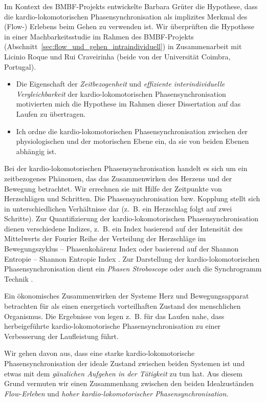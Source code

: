 Im Kontext des \acs{BMBF}-Projekts entwickelte Barbara Grüter die Hypothese, dass die kardio-lokomotorischen Phasensynchronisation als implizites Merkmal des (Flow-) Erlebens beim Gehen zu verwenden ist. Wir überprüften die Hypothese in einer Machbarkeitsstudie im Rahmen des \acs{BMBF}-Projekts (Abschnitt~\ref{sec:flow_und_gehen_intraindividuell}) in Zusammenarbeit mit Licinio Roque und Rui Craveirinha (beide von der Universität Coimbra, Portugal). 
\begin{itemize}
	
	\item Die Eigenschaft der \emph{Zeitbezogenheit} und \emph{effiziente interindividuelle Vergleichbarkeit} der kardio-lokomotorischen Phasensynchronisation motivierten mich die Hypothese im Rahmen dieser Dissertation auf das Laufen zu übertragen.
	
	\item Ich ordne die kardio-lokomotorischen Phasensynchronisation zwischen der physiologischen und der motorischen Ebene ein, da sie von beiden Ebenen abhängig ist.
	
\end{itemize}

Bei der kardio-lokomotorischen Phasensynchronisation handelt es sich um ein zeitbezogenes Phänomen, das das Zusammenwirken des Herzens und der Bewegung betrachtet. Wir errechnen sie mit Hilfe der Zeitpunkte von Herzschlägen und Schritten. Die Phasensynchronisation bzw. Kopplung stellt sich in unterschiedlichen Verhältnisse dar (z.~B. ein Herzschlag folgt auf zwei Schritte). Zur Quantifizierung der kardio-lokomotorischen Phasensynchronisation dienen verschiedene Indizes, z.~B. ein Index basierend auf der Intensität des Mittelwerts der Fourier Reihe der Verteilung der Herzschläge im Bewegungszyklus -- Phasenkohärenz Index \citep{Rosenblum2003} oder basierend auf der Shannon Entropie -- Shannon Entropie Index \citep{Tass1998, Niizeki2005}. Zur Darstellung der kardio-lokomotorischen Phasensynchronisation dient ein \emph{Phasen Stroboscope} \citep{Mrowka2000} oder auch die Synchrogramm Technik \citep{Schafer1999}.

Ein ökonomisches Zusammenwirken der Systeme Herz und Bewegungsapparat betrachten für \citet[S.~18]{Niizeki2014} als einen energetisch vorteilhaften Zustand des menschlichen Organismus. Die Ergebnisse von \citet{Phillips2013} legen z.~B. für das Laufen nahe, dass herbeigeführte kardio-lokomotorische Phasensynchronisation zu einer Verbesserung der Laufleistung führt.

Wir gehen davon aus, dass eine starke kardio-lokomotorische Phasensynchronisation der ideale Zustand zwischen beiden Systemen ist und etwas mit dem \emph{gänzlichen Aufgehen in der Tätigkeit} zu tun hat. Aus diesem Grund vermuten wir einen Zusammenhang zwischen den beiden Idealzuständen \emph{Flow-Erleben} und \emph{hoher kardio-lokomotorischer Phasensynchronisation}.

